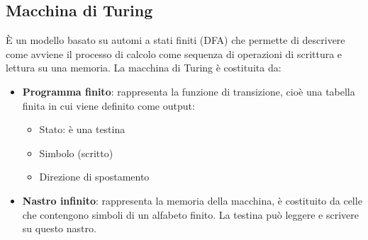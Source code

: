 \documentclass[a4paper]{article}
\begin{document}
\subsection{Macchina di Turing}
È un modello basato su automi a stati finiti (DFA) che permette di descrivere come avviene
il processo di calcolo come sequenza di operazioni di scrittura e lettura su una memoria.
La macchina di Turing è costituita da:
\begin{itemize}
  \item \textbf{Programma finito}: rappresenta la funzione di transizione, cioè una tabella
    finita in cui viene definito come output:
    \begin{itemize}
      \item Stato: è una testina
      \item Simbolo (scritto)
      \item Direzione di spostamento
    \end{itemize}

  \item \textbf{Nastro infinito}: rappresenta la memoria della macchina, è costituito da
    celle che contengono simboli di un alfabeto finito. La testina può leggere e scrivere
    su questo nastro.
\end{itemize}
\end{document}
